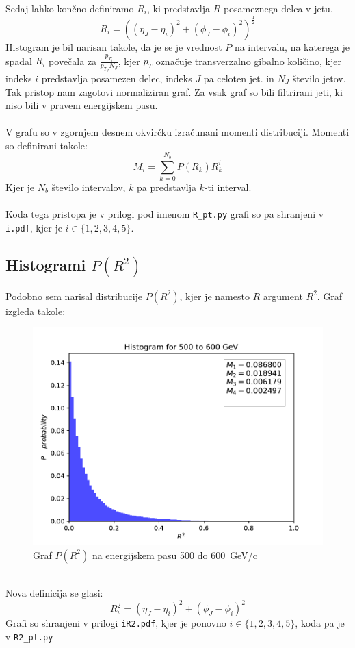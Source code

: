 Sedaj lahko končno definiramo $R_i$, ki predstavlja $R$ posameznega delca v jetu.
\begin{equation}
    R_i = \left( \left(\eta_J - \eta_i\right)^2 + \left(\phi_J - \phi_i\right)^2 \right)^\frac{1}{2}
\end{equation}
Histogram je bil narisan takole, da je se je vrednost $P$ na intervalu, na katerega je spadal
$R_i$ povečala za $\frac{p_{T_i}}{p_{T_J}N_J}$, kjer $p_T$ označuje transverzalno gibalno količino, 
kjer indeks $i$ predstavlja posamezen delec, indeks $J$ pa celoten jet.
in $N_J$ število jetov. Tak pristop nam zagotovi normaliziran graf. Za vsak graf so bili filtrirani jeti,
ki niso bili v pravem energijskem pasu. 
\\
\\
V grafu so v zgornjem desnem okvirčku izračunani momenti distribuciji. Momenti so definirani takole:
\begin{equation}
    M_i = \sum_{k=0}^{N_b} P(R_k) R_k^i
\end{equation}
Kjer je $N_b$ število intervalov, $k$ pa predstavlja $k$-ti interval.
\\
\\
Koda tega pristopa je v prilogi
pod imenom \verb|R_pt.py|
grafi so pa shranjeni v \verb|i.pdf|, kjer je $i\in\{1,2,3,4,5\}$.
\subsection{Histogrami $P(R^2)$}
Podobno sem narisal distribucije $P(R^2)$, kjer je namesto $R$ argument $R^2$.
Graf izgleda takole:
\begin{figure}[h]
    \begin{center}
        \includegraphics[width=13cm]{sections/section2/figures/1R2.pdf}
        \caption{Graf $P(R^2)$ na energijskem pasu 500 do \SI{600}{\giga\electronvolt}/c}
        \label{slika 3}
    \end{center}
\end{figure}
\\
Nova definicija se glasi:
\begin{equation}
    R_i^2 = \left(\eta_J - \eta_i\right)^2 + \left(\phi_J - \phi_i\right)^2\label{5}
\end{equation}
Grafi so shranjeni v prilogi \verb|iR2.pdf|, kjer je ponovno $i\in\{1,2,3,4,5\}$, koda pa je v
\verb|R2_pt.py|